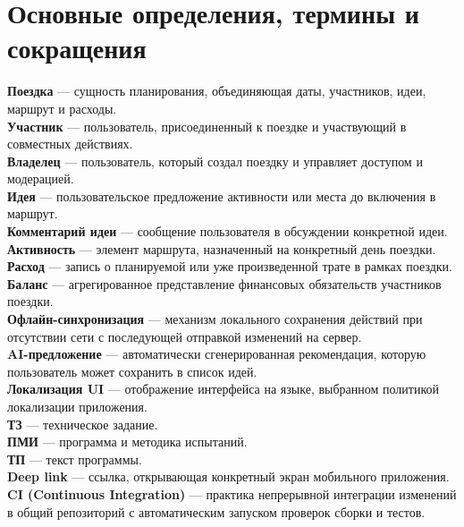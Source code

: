 \section*{Основные определения, термины и сокращения}

\noindent \textbf{Поездка} --- сущность планирования, объединяющая даты, участников, идеи, маршрут и расходы.\\
\noindent \textbf{Участник} --- пользователь, присоединенный к поездке и участвующий в совместных действиях.\\
\noindent \textbf{Владелец} --- пользователь, который создал поездку и управляет доступом и модерацией.\\
\noindent \textbf{Идея} --- пользовательское предложение активности или места до включения в маршрут.\\
\noindent \textbf{Комментарий идеи} --- сообщение пользователя в обсуждении конкретной идеи.\\
\noindent \textbf{Активность} --- элемент маршрута, назначенный на конкретный день поездки.\\
\noindent \textbf{Расход} --- запись о планируемой или уже произведенной трате в рамках поездки.\\
\noindent \textbf{Баланс} --- агрегированное представление финансовых обязательств участников поездки.\\
\noindent \textbf{Офлайн-синхронизация} --- механизм локального сохранения действий при отсутствии сети с последующей отправкой изменений на сервер.\\
\noindent \textbf{AI-предложение} --- автоматически сгенерированная рекомендация, которую пользователь может сохранить в список идей.\\
\noindent \textbf{Локализация UI} --- отображение интерфейса на языке, выбранном политикой локализации приложения.\\
\noindent \textbf{ТЗ} --- техническое задание.\\
\noindent \textbf{ПМИ} --- программа и методика испытаний.\\
\noindent \textbf{ТП} --- текст программы.\\
\noindent \textbf{Deep link} --- ссылка, открывающая конкретный экран мобильного приложения.\\
\noindent \textbf{CI (Continuous Integration)} --- практика непрерывной интеграции изменений в общий репозиторий с автоматическим запуском проверок сборки и тестов.
